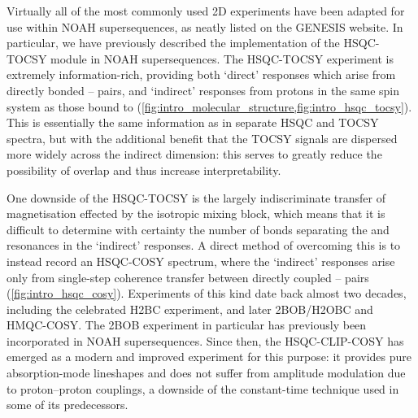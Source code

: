 \documentclass[a4paper,12pt]{article}
\newcommand{\proton}{\ch{^{1}H}}
\newcommand{\carbon}{\ch{^{13}C}}
\newcommand{\CH}{\carbon{}--\proton{}}
\newcommand{\HH}{\proton{}--\proton{}}
\begin{document}
\begin{refsection}
Virtually all of the most commonly used 2D experiments have been adapted for use within NOAH supersequences, as neatly listed on the GENESIS website\autocite{Yong2022AC}.
In particular, we have previously described the implementation of the HSQC-TOCSY module in NOAH supersequences.\autocite{Yong2021JMR}
The HSQC-TOCSY experiment is extremely information-rich, providing both `direct' responses which arise from directly bonded \CH{} pairs, and `indirect' responses from protons in the same spin system as those bound to \carbon{} (\cref{fig:intro_molecular_structure,fig:intro_hsqc_tocsy}).
This is essentially the same information as in separate HSQC and TOCSY spectra, but with the additional benefit that the TOCSY signals are dispersed more widely across the \carbon{} indirect dimension: this serves to greatly reduce the possibility of overlap and thus increase interpretability.

One downside of the HSQC-TOCSY is the largely indiscriminate transfer of magnetisation effected by the isotropic mixing block, which means that it is difficult to determine with certainty the number of bonds separating the \carbon{} and \proton{} resonances in the `indirect' responses.
A direct method of overcoming this is to instead record an HSQC-COSY spectrum, where the `indirect' responses arise only from single-step coherence transfer between directly coupled \HH{} pairs (\cref{fig:intro_hsqc_cosy}).
Experiments of this kind date back almost two decades, including the celebrated H2BC experiment\autocite{Nyberg2005JACS,Nyberg2005MRC}, and later 2BOB/H2OBC\autocite{Kupce2017MRC} and HMQC-COSY\autocite{Hu2011JBNMR}.
The 2BOB experiment in particular has previously been incorporated in NOAH supersequences\autocite{Kupce2019JMR}.
Since then, the HSQC-CLIP-COSY\autocite{Gyongyosi2018CPC,Gyongyosi2021AC} has emerged as a modern and improved experiment for this purpose: it provides pure absorption-mode lineshapes and does not suffer from amplitude modulation due to proton--proton couplings, a downside of the constant-time technique used in some of its predecessors.


\end{refsection}
\end{document}
